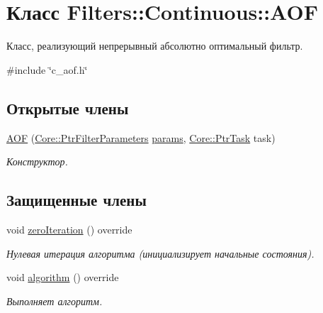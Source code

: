 \hypertarget{class_filters_1_1_continuous_1_1_a_o_f}{}\section{Класс Filters\+:\+:Continuous\+:\+:A\+OF}
\label{class_filters_1_1_continuous_1_1_a_o_f}


Класс, реализующий непрерывный абсолютно оптимальный фильтр.  




{\ttfamily \#include \char`\"{}c\+\_\+aof.\+h\char`\"{}}

\subsection*{Открытые члены}
\begin{DoxyCompactItemize}
\item 
\hyperlink{class_filters_1_1_continuous_1_1_a_o_f_a92b07f56c7e0254c635404f0d1d04fa3}{A\+OF} (\hyperlink{namespace_core_a4811af8148ba137d644b9a61a042cf03}{Core\+::\+Ptr\+Filter\+Parameters} \hyperlink{class_core_1_1_filter_a44aa749b49ba46256975ce545531ecf7}{params}, \hyperlink{namespace_core_abfda8f69fcacfcea2696549b548ed737}{Core\+::\+Ptr\+Task} task)\hypertarget{class_filters_1_1_continuous_1_1_a_o_f_a92b07f56c7e0254c635404f0d1d04fa3}{}\label{class_filters_1_1_continuous_1_1_a_o_f_a92b07f56c7e0254c635404f0d1d04fa3}

\begin{DoxyCompactList}\small\item\em Конструктор. \end{DoxyCompactList}\end{DoxyCompactItemize}
\subsection*{Защищенные члены}
\begin{DoxyCompactItemize}
\item 
void \hyperlink{class_filters_1_1_continuous_1_1_a_o_f_ab416b56dbeb26366f495f03b3c08ad5e}{zero\+Iteration} () override
\begin{DoxyCompactList}\small\item\em Нулевая итерация алгоритма (инициализирует начальные состояния). \end{DoxyCompactList}\item 
void \hyperlink{class_filters_1_1_continuous_1_1_a_o_f_af25cf723db57bba9d52173b27f960170}{algorithm} () override
\begin{DoxyCompactList}\small\item\em Выполняет алгоритм. \end{DoxyCompactList}\end{DoxyCompactItemize}
